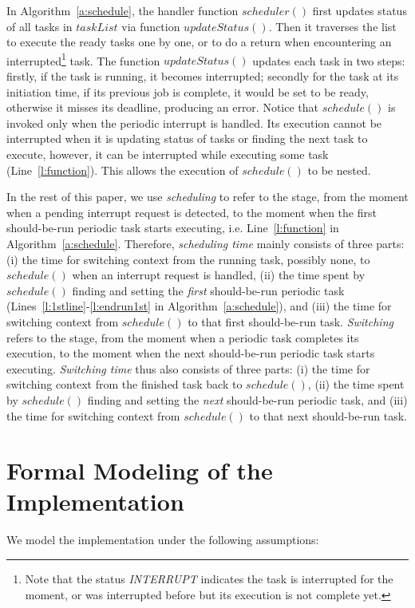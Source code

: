 \documentclass{llncs}
\begin{document}
In Algorithm~\ref{a:schedule}, the handler function $scheduler()$
first updates status of all tasks in $taskList$ via function
$updateStatus()$. Then it traverses the list to execute the ready
tasks one by one, or to do a return when encountering an
interrupted\footnote{Note that the status \textit{INTERRUPT} indicates
  the task is interrupted for the moment, or was interrupted before
  but its execution is not complete yet.} task. The function
$updateStatus()$ updates each task in two steps: firstly, if the task
is running, it becomes interrupted; secondly for the task at its
initiation time, if its previous job is complete, it would be set to
be ready, otherwise it misses its deadline, producing an error. Notice
that $schedule()$ is invoked only when the periodic interrupt is
handled. Its execution cannot be interrupted when it is updating
status of tasks or finding the next task to execute, however, it can
be interrupted while executing some task (Line~\ref{l:function}). This
allows the execution of $schedule()$ to be nested.

In the rest of this paper, we use \emph{scheduling} to refer to the
stage, from the moment when a pending interrupt request is detected,
to the moment when the first should-be-run periodic task starts
executing, i.e. Line~\ref{l:function} in
Algorithm~\ref{a:schedule}. Therefore, \emph{scheduling time} mainly
consists of three parts: (i) the time for switching context from the
running task, possibly none, to $schedule()$ when an interrupt request
is handled, (ii) the time spent by $schedule()$ finding and setting
the \emph{first} should-be-run periodic task
(Lines~\ref{l:1stline}-\ref{l:endrun1st} in
Algorithm~\ref{a:schedule}), and (iii) the time for switching context
from $schedule()$ to that first should-be-run task. \emph{Switching}
refers to the stage, from the moment when a periodic task completes
its execution, to the moment when the next should-be-run periodic task
starts executing. \emph{Switching time} thus also consists of three
parts: (i) the time for switching context from the finished task back
to $schedule()$, (ii) the time spent by $schedule()$ finding and
setting the \emph{next} should-be-run periodic task, and (iii) the
time for switching context from $schedule()$ to that next
should-be-run task.

\section{Formal Modeling of the Implementation}
\label{s:formalism}
We model the implementation under the following assumptions:
\end{document}
